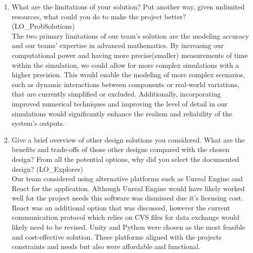 \documentclass[12pt, titlepage]{article}
\begin{document}
\begin{enumerate}
  \item What are the limitations of your solution?  Put another way, given
  unlimited resources, what could you do to make the project better? (LO\_ProbSolutions)
  \\
  The two primary limitations of our team's solution are the modeling accuracy and our teams' expertise in advanced mathematics. 
  By increasing our computational power and having more precise(smaller) measurements of time within the simulation, we could allow for more complex simulations with a higher precision. 
  This would enable the modeling of more complex scenarios, such as dynamic interactions between components or real-world variations, that are currently simplified or excluded. 
  Additionally, incorporating improved numerical techniques and improving the level of detail in our simulations would significantly enhance the realism and reliability of the system's outputs.
  
  \item Give a brief overview of other design solutions you considered.  What
  are the benefits and trade-offs of those other designs compared with the chosen
  design?  From all the potential options, why did you select the documented design?
  (LO\_Explores)
  \\
  Our team considered using alternative platforms such as Unreal Engine and React for the application. 
  Although Unreal Engine would have likely worked well for the project needs this software was dismissed due it's licensing cost. 
  React was an additional option that was discussed, however the current communication protocol which relies on CVS files for data exchange would likely need to be revised. 
  Unity and Python were chosen as the most feasible and cost-effective solution.
  These platforms aligned  with the projects constraints and needs but also were affordable and functional. 
\end{enumerate}
\end{document}
